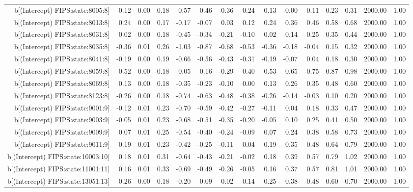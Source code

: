 \begin{table}[ht]
\begin{tabular}{rrrrrrrrrrrrrrr}
  b[(Intercept) FIPS:state:8005:8] & -0.12 & 0.00 & 0.18 & -0.57 & -0.46 & -0.36 & -0.24 & -0.13 & -0.00 & 0.11 & 0.23 & 0.31 & 2000.00 & 1.00 \\ 
  b[(Intercept) FIPS:state:8013:8] & 0.24 & 0.00 & 0.17 & -0.17 & -0.07 & 0.03 & 0.12 & 0.24 & 0.36 & 0.46 & 0.58 & 0.68 & 2000.00 & 1.00 \\ 
  b[(Intercept) FIPS:state:8031:8] & 0.02 & 0.00 & 0.18 & -0.45 & -0.34 & -0.21 & -0.10 & 0.02 & 0.14 & 0.25 & 0.35 & 0.44 & 2000.00 & 1.00 \\ 
  b[(Intercept) FIPS:state:8035:8] & -0.36 & 0.01 & 0.26 & -1.03 & -0.87 & -0.68 & -0.53 & -0.36 & -0.18 & -0.04 & 0.15 & 0.32 & 2000.00 & 1.00 \\ 
  b[(Intercept) FIPS:state:8041:8] & -0.19 & 0.00 & 0.19 & -0.66 & -0.56 & -0.43 & -0.31 & -0.19 & -0.07 & 0.04 & 0.18 & 0.30 & 2000.00 & 1.00 \\ 
  b[(Intercept) FIPS:state:8059:8] & 0.52 & 0.00 & 0.18 & 0.05 & 0.16 & 0.29 & 0.40 & 0.53 & 0.65 & 0.75 & 0.87 & 0.98 & 2000.00 & 1.00 \\ 
  b[(Intercept) FIPS:state:8069:8] & 0.13 & 0.00 & 0.18 & -0.35 & -0.23 & -0.10 & 0.00 & 0.13 & 0.26 & 0.35 & 0.48 & 0.60 & 2000.00 & 1.00 \\ 
  b[(Intercept) FIPS:state:8123:8] & -0.26 & 0.00 & 0.18 & -0.74 & -0.63 & -0.48 & -0.38 & -0.26 & -0.14 & -0.03 & 0.10 & 0.20 & 2000.00 & 1.00 \\ 
  b[(Intercept) FIPS:state:9001:9] & -0.12 & 0.01 & 0.23 & -0.70 & -0.59 & -0.42 & -0.27 & -0.11 & 0.04 & 0.18 & 0.33 & 0.47 & 2000.00 & 1.00 \\ 
  b[(Intercept) FIPS:state:9003:9] & -0.05 & 0.01 & 0.23 & -0.68 & -0.51 & -0.35 & -0.20 & -0.05 & 0.10 & 0.25 & 0.41 & 0.50 & 2000.00 & 1.00 \\ 
  b[(Intercept) FIPS:state:9009:9] & 0.07 & 0.01 & 0.25 & -0.54 & -0.40 & -0.24 & -0.09 & 0.07 & 0.24 & 0.38 & 0.58 & 0.73 & 2000.00 & 1.00 \\ 
  b[(Intercept) FIPS:state:9011:9] & 0.19 & 0.01 & 0.23 & -0.42 & -0.25 & -0.11 & 0.04 & 0.19 & 0.35 & 0.48 & 0.64 & 0.79 & 2000.00 & 1.00 \\ 
  b[(Intercept) FIPS:state:10003:10] & 0.18 & 0.01 & 0.31 & -0.64 & -0.43 & -0.21 & -0.02 & 0.18 & 0.39 & 0.57 & 0.79 & 1.02 & 2000.00 & 1.00 \\ 
  b[(Intercept) FIPS:state:11001:11] & 0.16 & 0.01 & 0.33 & -0.69 & -0.49 & -0.26 & -0.05 & 0.16 & 0.37 & 0.57 & 0.81 & 1.01 & 2000.00 & 1.00 \\ 
  b[(Intercept) FIPS:state:13051:13] & 0.26 & 0.00 & 0.18 & -0.20 & -0.09 & 0.02 & 0.14 & 0.25 & 0.38 & 0.48 & 0.60 & 0.70 & 2000.00 & 1.00 \\ 

\end{tabular}
\end{table}
